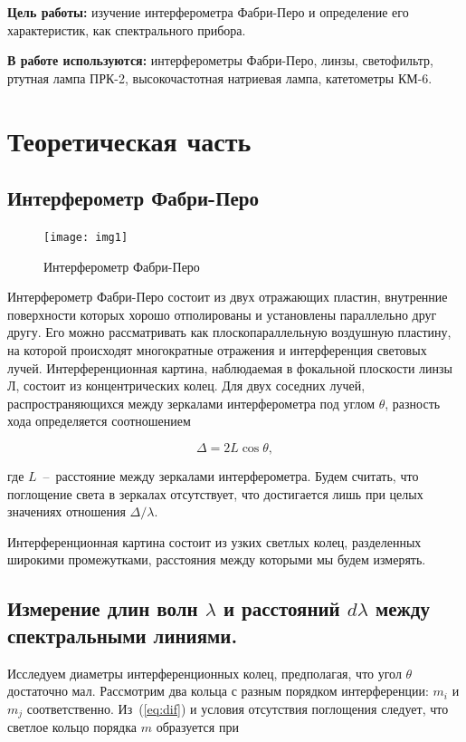 \documentclass{letask}
\begin{document}


\textbf{Цель работы:}
изучение интерферометра Фабри-Перо и определение его характеристик, как спектрального прибора.

\textbf{В работе используются:} интерферометры Фабри-Перо, линзы, светофильтр, ртутная лампа ПРК-2, высокочастотная натриевая лампа, катетометры КМ-6.

\section{Теоретическая часть}

\subsection*{Интерферометр Фабри-Перо}

\begin{figure}
\texttt{[image: img1]}
\caption{Интерферометр Фабри-Перо}
\end{figure}

Интерферометр Фабри-Перо состоит из двух отражающих пластин, внутренние поверхности которых хорошо отполированы и установлены параллельно друг другу. Его можно рассматривать как плоскопараллельную воздушную пластину, на которой происходят многократные отражения и интерференция световых лучей. Интерференционная картина, наблюдаемая в фокальной плоскости линзы Л, состоит из концентрических колец. 
Для двух соседних лучей, распространяющихся между зеркалами интерферометра под углом $\theta$, разность хода определяется соотношением
 
\begin{equation}
\Delta = 2 L \cos \theta,
\label{eq:dif}
\end{equation}

где $L$~--~расстояние между зеркалами интерферометра.
Будем считать, что поглощение света в зеркалах отсутствует, что достигается лишь при целых значениях отношения $\Delta / \lambda$.

Интерференционная картина состоит из узких светлых колец, разделенных широкими промежутками, расстояния между которыми мы будем измерять.

\subsection*{Измерение длин волн $\lambda$ и расстояний $d \lambda$ между спектральными линиями.}

Исследуем диаметры интерференционных колец, предполагая, что угол $\theta$ достаточно мал.
Рассмотрим два кольца с разным порядком интерференции: $m_i$ и $m_j$ соответственно. 
Из~(\ref{eq:dif}) и условия отсутствия поглощения следует, что светлое кольцо порядка $m$ образуется при 
\end{document}
